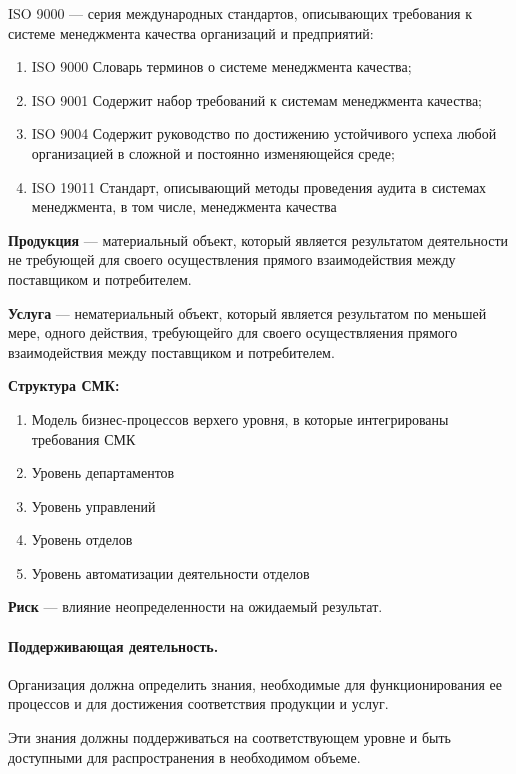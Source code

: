 ISO 9000 --- серия международных стандартов, описывающих требования к системе
менеджмента качества организаций и предприятий:
\begin{enumerate}
  \item ISO 9000 Словарь терминов о системе менеджмента качества;
  \item ISO 9001 Содержит набор требований к системам менеджмента качества;
  \item ISO 9004 Содержит руководство по достижению устойчивого успеха любой
    организацией в сложной и постоянно изменяющейся среде;
  \item ISO 19011 Стандарт, описывающий методы проведения аудита в системах
    менеджмента, в том числе, менеджмента качества
\end{enumerate}

\textbf{Продукция }--- материальный объект, который является результатом
деятельности не требующей для своего осуществления прямого взаимодействия между
поставщиком и потребителем.

\textbf{Услуга} --- нематериальный объект, который является результатом по
меньшей мере, одного действия, требующейго для своего осуществляения прямого
взаимодействия между поставщиком и потребителем.

\textbf{Структура СМК:}
\begin{enumerate}
  \item Модель бизнес-процессов верхего уровня, в которые интегрированы
    требования СМК
  \item Уровень департаментов
  \item Уровень управлений
  \item Уровень отделов
  \item Уровень автоматизации деятельности отделов
\end{enumerate}

\textbf{Риск} --- влияние неопределенности на ожидаемый результат.

\paragraph{Поддерживающая деятельность.}\mbox{}\par

Организация должна определить знания, необходимые для функционирования ее
процессов и для достижения соответствия продукции и услуг.

Эти знания должны поддерживаться на соответствующем уровне и быть доступными для
распространения в необходимом объеме.

